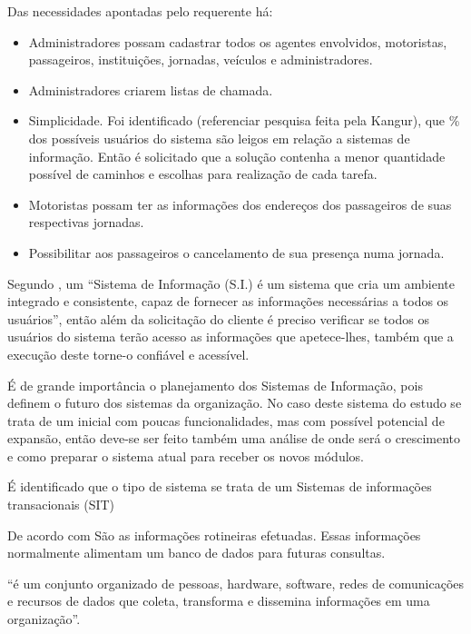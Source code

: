 \documentclass[
	12pt,				%
 	oneside,			%
 	openany,
	a4paper,			%
	english,			%
	french,				%
	spanish,			%
	brazil				%
	]{abntex2}
\begin{document}
Das necessidades apontadas pelo requerente há:

\begin{itemize}
	 \item Administradores possam cadastrar todos os agentes envolvidos, 
	 motoristas, passageiros, instituições, jornadas, veículos e administradores.

	\item Administradores criarem listas de chamada.

	\item Simplicidade. Foi identificado (referenciar pesquisa
	feita pela Kangur), que \% dos possíveis usuários do sistema 
	são leigos em relação a sistemas de informação. Então é 
	solicitado que a solução contenha a menor quantidade possível 
	de caminhos e escolhas para realização de cada tarefa.

	\item Motoristas possam ter as informações dos endereços dos 
	passageiros de suas respectivas jornadas.

	\item Possibilitar aos passageiros o cancelamento de sua presença numa jornada.
\end{itemize}

Segundo \cite[p.~98]{spinolapessoa1998}, um “Sistema de Informação (S.I.) é um
sistema que cria um ambiente integrado e consistente, capaz de fornecer as informações necessárias a todos os usuários”, então além da solicitação do cliente é preciso verificar se todos os usuários do sistema terão acesso as informações que apetece-lhes, também que a execução deste torne-o confiável e acessível.

É de grande importância o planejamento dos Sistemas de Informação, pois definem o futuro dos sistemas da organização. No caso deste sistema do estudo se trata de um inicial com poucas funcionalidades, mas com possível potencial de expansão, então deve-se ser feito também uma análise de onde será o crescimento e como preparar o sistema atual para receber os novos módulos.


É identificado que o tipo de sistema se trata de um Sistemas de informações transacionais (SIT)

De acordo com \cite{obrien2004} São as informações rotineiras efetuadas. Essas informações normalmente alimentam um banco de dados para futuras consultas. 

\cite[p.~6]{obrien2004} “é um conjunto organizado de pessoas, hardware, software, redes de comunicações e recursos de dados que coleta, transforma e dissemina informações em uma organização”.
\end{document}
